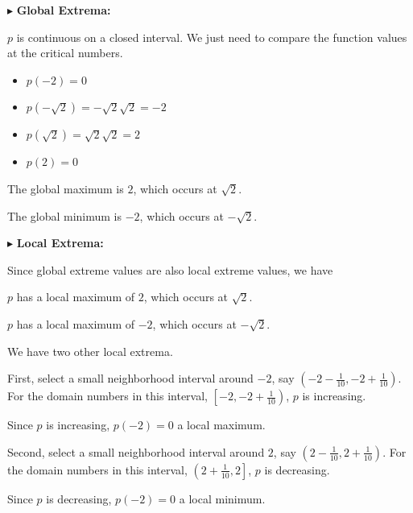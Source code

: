 \documentclass{ximera}
\begin{document}
$\blacktriangleright$ \textbf{\textcolor{blue!55!black}{Global Extrema:}}  


$p$ is continuous on a closed interval.  We just need to compare the function values at the critical numbers.


\begin{itemize}
  \item $p(-2) = 0$
  \item $p(-\sqrt{2}) = -\sqrt{2}\sqrt{2} = -2$
  \item $p(\sqrt{2}) = \sqrt{2}\sqrt{2} = 2$
  \item $p(2) = 0$
\end{itemize}


The global maximum is $2$, which occurs at $\sqrt{2}$. 


The global minimum is $-2$, which occurs at $-\sqrt{2}$. 









$\blacktriangleright$ \textbf{\textcolor{blue!55!black}{Local Extrema:}}  


Since global extreme values are also local extreme values, we have 


$p$ has a local maximum of $2$, which occurs at $\sqrt{2}$. 


$p$ has a local maximum of $-2$, which occurs at $-\sqrt{2}$. 

We have two other local extrema.






First, select a small neighborhood interval around $-2$, say $\left( -2 - \frac{1}{10}, -2 + \frac{1}{10} \right)$. For the domain numbers in this interval, $\left[ -2, -2 + \frac{1}{10} \right)$, $p$ is increasing. 

Since $p$ is increasing, $p(-2)= 0$ a local maximum. 







Second, select a small neighborhood interval around $2$, say $\left( 2 - \frac{1}{10}, 2 + \frac{1}{10} \right)$. For the domain numbers in this interval, $\left( 2 + \frac{1}{10}, 2 \right]$, $p$ is decreasing. 

Since $p$ is decreasing, $p(-2)= 0$ a local minimum. 
\end{document}
